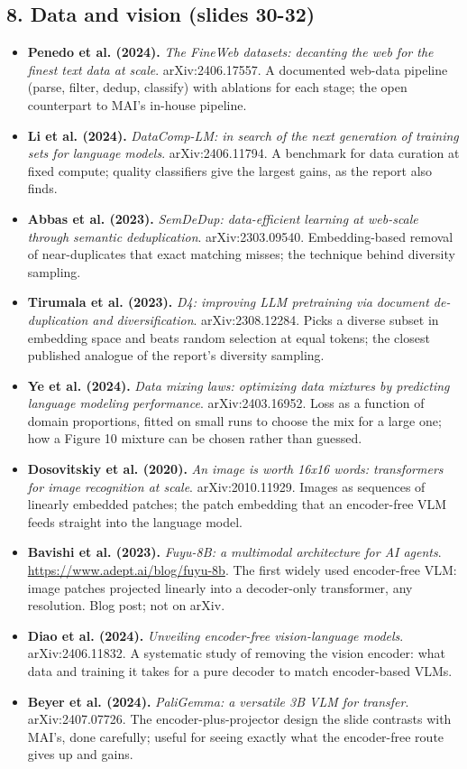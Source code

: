 \documentclass[11pt,letterpaper]{article}
\begin{document}
\subsection*{8. Data and vision (slides 30-32)}
\begin{itemize}[leftmargin=1.2em,itemsep=3pt]\sloppy
\item \textbf{Penedo et al. (2024).} \textit{The FineWeb datasets: decanting the web for the finest text data at scale}. arXiv:2406.17557. A documented web-data pipeline (parse, filter, dedup, classify) with ablations for each stage; the open counterpart to MAI's in-house pipeline.
\item \textbf{Li et al. (2024).} \textit{DataComp-LM: in search of the next generation of training sets for language models}. arXiv:2406.11794. A benchmark for data curation at fixed compute; quality classifiers give the largest gains, as the report also finds.
\item \textbf{Abbas et al. (2023).} \textit{SemDeDup: data-efficient learning at web-scale through semantic deduplication}. arXiv:2303.09540. Embedding-based removal of near-duplicates that exact matching misses; the technique behind diversity sampling.
\item \textbf{Tirumala et al. (2023).} \textit{D4: improving LLM pretraining via document de-duplication and diversification}. arXiv:2308.12284. Picks a diverse subset in embedding space and beats random selection at equal tokens; the closest published analogue of the report's diversity sampling.
\item \textbf{Ye et al. (2024).} \textit{Data mixing laws: optimizing data mixtures by predicting language modeling performance}. arXiv:2403.16952. Loss as a function of domain proportions, fitted on small runs to choose the mix for a large one; how a Figure 10 mixture can be chosen rather than guessed.
\item \textbf{Dosovitskiy et al. (2020).} \textit{An image is worth 16x16 words: transformers for image recognition at scale}. arXiv:2010.11929. Images as sequences of linearly embedded patches; the patch embedding that an encoder-free VLM feeds straight into the language model.
\item \textbf{Bavishi et al. (2023).} \textit{Fuyu-8B: a multimodal architecture for AI agents}. \url{https://www.adept.ai/blog/fuyu-8b}. The first widely used encoder-free VLM: image patches projected linearly into a decoder-only transformer, any resolution. Blog post; not on arXiv.
\item \textbf{Diao et al. (2024).} \textit{Unveiling encoder-free vision-language models}. arXiv:2406.11832. A systematic study of removing the vision encoder: what data and training it takes for a pure decoder to match encoder-based VLMs.
\item \textbf{Beyer et al. (2024).} \textit{PaliGemma: a versatile 3B VLM for transfer}. arXiv:2407.07726. The encoder-plus-projector design the slide contrasts with MAI's, done carefully; useful for seeing exactly what the encoder-free route gives up and gains.
\end{itemize}
\end{document}

